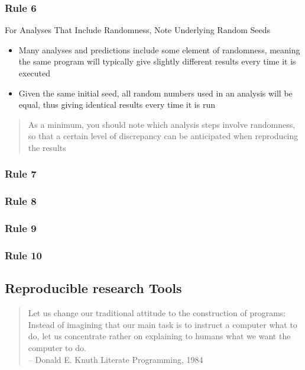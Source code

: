 \documentclass{beamer}
\begin{document}
\begin{frame}
\frametitle{Rule 6}
{\sc For Analyses That Include Randomness, Note Underlying Random Seeds}
\begin{itemize}
    \item Many analyses and predictions include some element of randomness, meaning the same program will typically give slightly different results every time it is executed
    \item Given the same initial seed, all random numbers used in an analysis will be equal, thus giving identical results every time it is run
\end{itemize}
\begin{quote}
    As a minimum, you should note which analysis steps involve randomness, so that a certain level of discrepancy can be anticipated when reproducing the results
\end{quote}
\end{frame}
\begin{frame}
\frametitle{Rule 7}


\end{frame}
\begin{frame}
\frametitle{Rule 8}


\end{frame}
\begin{frame}
\frametitle{Rule 9}


\end{frame}
\begin{frame}
\frametitle{Rule 10}


\end{frame}
\begin{frame}
\section{Reproducible research Tools}
\begin{quote}
\scriptsize    Let us change our traditional attitude to the construction of programs: Instead of imagining that our main task is to instruct a computer what to do, let us concentrate rather on explaining to humans what we want the computer to do.\\
\raggedleft   -- Donald E. Knuth Literate Programming, 1984
\end{quote}
\end{frame}
\end{document}
